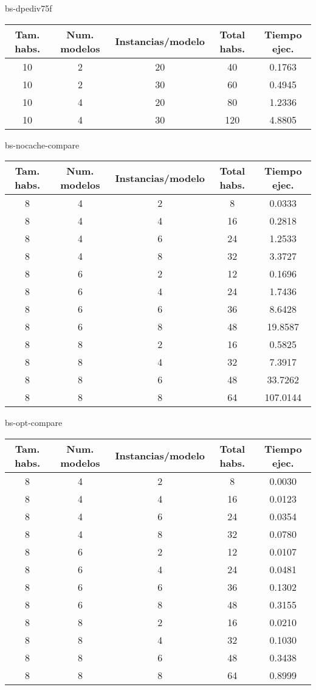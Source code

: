 bs-dpediv75f
\begin{center}
	\begin{tabular}{ | c | c | c | c | c | }
\hline
Tam. habs. & Num. modelos & Instancias/modelo & Total habs. & Tiempo ejec. \\ \hline 
10 & 2 & 20 & 40 & 0.1763 \\ 
10 & 2 & 30 & 60 & 0.4945 \\ 
10 & 4 & 20 & 80 & 1.2336 \\ 
10 & 4 & 30 & 120 & 4.8805 \\ 
\hline
	\end{tabular}
\end{center}

bs-nocache-compare
\begin{center}
	\begin{tabular}{ | c | c | c | c | c | }
\hline
Tam. habs. & Num. modelos & Instancias/modelo & Total habs. & Tiempo ejec. \\ \hline 
8 & 4 & 2 & 8 & 0.0333 \\ 
8 & 4 & 4 & 16 & 0.2818 \\ 
8 & 4 & 6 & 24 & 1.2533 \\ 
8 & 4 & 8 & 32 & 3.3727 \\ 
8 & 6 & 2 & 12 & 0.1696 \\ 
8 & 6 & 4 & 24 & 1.7436 \\ 
8 & 6 & 6 & 36 & 8.6428 \\ 
8 & 6 & 8 & 48 & 19.8587 \\ 
8 & 8 & 2 & 16 & 0.5825 \\ 
8 & 8 & 4 & 32 & 7.3917 \\ 
8 & 8 & 6 & 48 & 33.7262 \\ 
8 & 8 & 8 & 64 & 107.0144 \\ 
\hline
	\end{tabular}
\end{center}

bs-opt-compare
\begin{center}
	\begin{tabular}{ | c | c | c | c | c | }
\hline
Tam. habs. & Num. modelos & Instancias/modelo & Total habs. & Tiempo ejec. \\ \hline 
8 & 4 & 2 & 8 & 0.0030 \\ 
8 & 4 & 4 & 16 & 0.0123 \\ 
8 & 4 & 6 & 24 & 0.0354 \\ 
8 & 4 & 8 & 32 & 0.0780 \\ 
8 & 6 & 2 & 12 & 0.0107 \\ 
8 & 6 & 4 & 24 & 0.0481 \\ 
8 & 6 & 6 & 36 & 0.1302 \\ 
8 & 6 & 8 & 48 & 0.3155 \\ 
8 & 8 & 2 & 16 & 0.0210 \\ 
8 & 8 & 4 & 32 & 0.1030 \\ 
8 & 8 & 6 & 48 & 0.3438 \\ 
8 & 8 & 8 & 64 & 0.8999 \\ 
\hline
	\end{tabular}
\end{center}

